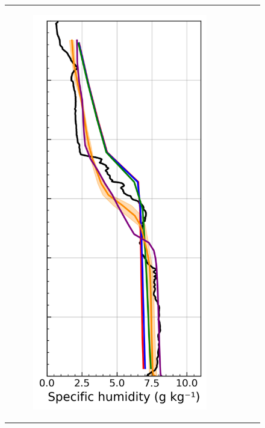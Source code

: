 \begin{figure}[hbtp]
{\begin{tabular}{@{}cccc@{}}
\begin{subfigure}[t]{0.289\textwidth}
            \includegraphics[width=\textwidth]{images/chap6/profiles/profile_elsplans_ovap_1507_.png}

\end{subfigure}
\end{tabular}}
\end{figure}
